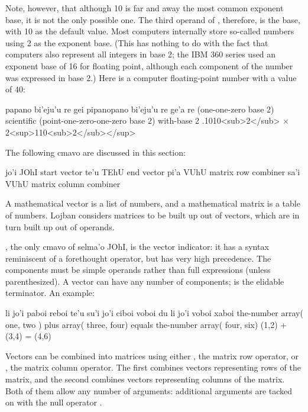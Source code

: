 Note, however, that although 10 is far and away the most common
    exponent base, it is not the only possible one. The third
    operand of , therefore, is the base, with 10 as the
    default value. Most computers internally store so-called
     numbers using 2 as the exponent base. (This
    has nothing to do with the fact that computers also represent
    all integers in base 2; the IBM 360 series used an exponent
    base of 16 for floating point, although each component of the
    number was expressed in base 2.) Here is a computer
    floating-point number with a value of 40:
\begin{example}
papano bi'eju'u re\n
\T	gei pipanopano bi'eju'u re ge'a re\n
(one-one-zero base 2)\n
\T	scientific (point-one-zero-one-zero base 2) with-base 2\n
.1010<sub>2</sub> $\times$2<sup>110<sub>2</sub></sup>
\end{example}



The following cmavo are discussed in this section:

   jo'i    JOhI    start vector
    te'u    TEhU    end vector
    pi'a    VUhU    matrix row combiner
    sa'i    VUhU    matrix column combiner

A mathematical vector is a list of numbers, and a mathematical
    matrix is a table of numbers. Lojban considers matrices to be
    built up out of vectors, which are in turn built up out of
    operands. 

, the only cmavo of selma'o JOhI, is the vector
    indicator: it has a syntax reminiscent of a forethought
    operator, but has very high precedence. The components must be
    simple operands rather than full expressions (unless
    parenthesized). A vector can have any number of components;
     is the elidable terminator. An example:
\begin{example}
li jo'i paboi reboi te'u su'i jo'i ciboi voboi\n
\T	du li jo'i voboi xaboi\n
the-number array( one, two ) plus array( three, four)\n
\T	equals the-number array( four, six)\n
(1,2) + (3,4) = (4,6)
\end{example}

Vectors can be combined into matrices using either ,
    the matrix row operator, or , the matrix column
    operator. The first combines vectors representing rows of the
    matrix, and the second combines vectors representing columns of
    the matrix. Both of them allow any number of arguments:
    additional arguments are tacked on with the null operator
    . 

